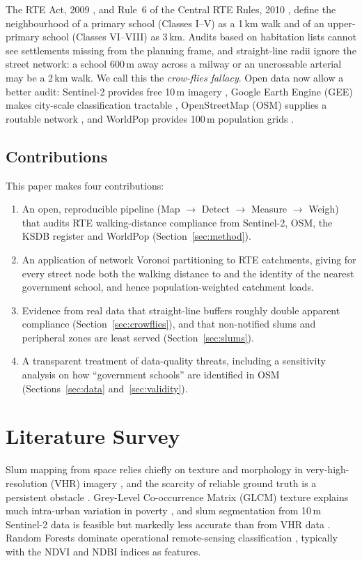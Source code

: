 \documentclass[conference]{IEEEtran}
\newcommand{\km}{\,km}
\newcommand{\m}{\,m}
\begin{document}
The RTE Act, 2009 \cite{rte2009}, and Rule~6 of the Central RTE Rules, 2010 \cite{rterules2010}, define the neighbourhood of a primary school (Classes I--V) as a 1\km{} walk and of an upper-primary school (Classes VI--VIII) as 3\km{}. Audits based on habitation lists cannot see settlements missing from the planning frame, and straight-line radii ignore the street network: a school 600\m{} away across a railway or an uncrossable arterial may be a 2\km{} walk. We call this the \emph{crow-flies fallacy}. Open data now allow a better audit: Sentinel-2 provides free 10\m{} imagery \cite{drusch2012}, Google Earth Engine (GEE) makes city-scale classification tractable \cite{gorelick2017}, OpenStreetMap (OSM) supplies a routable network \cite{boeing2017}, and WorldPop provides 100\m{} population grids \cite{tatem2017}.

\subsection{Contributions}
This paper makes four contributions:
\begin{enumerate}
\item An open, reproducible pipeline (Map $\rightarrow$ Detect $\rightarrow$ Measure $\rightarrow$ Weigh) that audits RTE walking-distance compliance from Sentinel-2, OSM, the KSDB register and WorldPop (Section~\ref{sec:method}).
\item An application of network Voronoi partitioning \cite{erwig2000,okabe2008} to RTE catchments, giving for every street node both the walking distance to and the identity of the nearest government school, and hence population-weighted catchment loads.
\item Evidence from real data that straight-line buffers roughly double apparent compliance (Section~\ref{sec:crowflies}), and that non-notified slums and peripheral zones are least served (Section~\ref{sec:slums}).
\item A transparent treatment of data-quality threats, including a sensitivity analysis on how ``government schools'' are identified in OSM (Sections~\ref{sec:data} and~\ref{sec:validity}).
\end{enumerate}

\section{Literature Survey}\label{sec:lit}
Slum mapping from space relies chiefly on texture and morphology in very-high-resolution (VHR) imagery \cite{kuffer2016,kohli2012}, and the scarcity of reliable ground truth is a persistent obstacle \cite{mahabir2018}. Grey-Level Co-occurrence Matrix (GLCM) texture \cite{haralick1973} explains much intra-urban variation in poverty \cite{duque2015}, and slum segmentation from 10\m{} Sentinel-2 data is feasible but markedly less accurate than from VHR data \cite{wurm2019}. Random Forests \cite{breiman2001} dominate operational remote-sensing classification \cite{belgiu2016}, typically with the NDVI \cite{tucker1979} and NDBI \cite{zha2003} indices as features.
\end{document}
